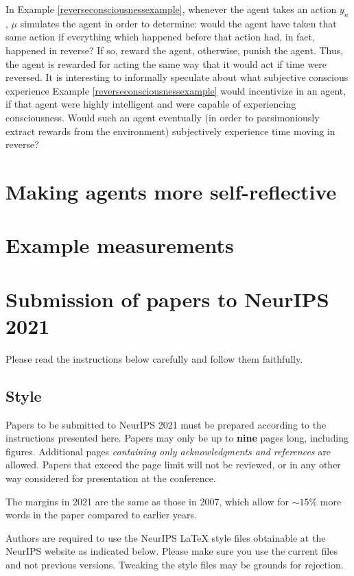 \documentclass{article}
\begin{document}
In Example \ref{reverseconsciousnessexample}, whenever the agent takes an action $y_n$,
$\mu$ simulates the agent in order to determine: would the agent have taken that same
action if everything which happened before that action had, in fact, happened in reverse?
If so, reward the agent, otherwise, punish the agent.
Thus, the agent is rewarded for acting the same way that it would act if time were
reversed. It is interesting to informally speculate about what subjective conscious
experience Example \ref{reverseconsciousnessexample} would incentivize in an agent,
if that agent were highly intelligent and were capable of experiencing consciousness.
Would such an agent eventually (in order to parsimoniously extract rewards from the
environment) subjectively experience time moving in reverse?


\section{Making agents more self-reflective}

\section{Example measurements}


\section{Submission of papers to NeurIPS 2021}

Please read the instructions below carefully and follow them faithfully.

\subsection{Style}

Papers to be submitted to NeurIPS 2021 must be prepared according to the
instructions presented here. Papers may only be up to {\bf nine} pages long,
including figures. Additional pages \emph{containing only acknowledgments and
references} are allowed. Papers that exceed the page limit will not be
reviewed, or in any other way considered for presentation at the conference.

The margins in 2021 are the same as those in 2007, which allow for $\sim$$15\%$
more words in the paper compared to earlier years.

Authors are required to use the NeurIPS \LaTeX{} style files obtainable at the
NeurIPS website as indicated below. Please make sure you use the current files
and not previous versions. Tweaking the style files may be grounds for
rejection.
\end{document}
